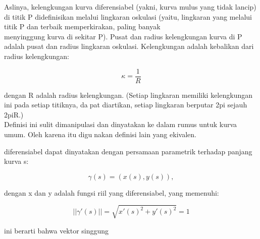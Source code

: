 \documentclass[a4paper,10pt]{article}
\begin{document}
\begin{eulernotebook}
\begin{eulercomment}
\begin{eulercomment}
\begin{eulercomment}
\begin{eulercomment}
\begin{eulercomment}
\begin{eulercomment}
\begin{eulercomment}
\begin{eulercomment}
\begin{eulercomment}
\begin{eulercomment}
\begin{eulercomment}
\begin{eulercomment}
\begin{eulercomment}
\begin{eulercomment}
\begin{eulercomment}
\begin{eulercomment}
\begin{eulercomment}
\begin{eulercomment}
\begin{eulercomment}
\begin{eulercomment}
\begin{eulercomment}
Aslinya, kelengkungan kurva diferensiabel (yakni, kurva mulus yang
tidak lancip) di titik P didefinisikan melalui lingkaran oskulasi
(yaitu, lingkaran yang melalui titik P dan terbaik memperkirakan,
paling banyak\\
menyinggung kurva di sekitar P). Pusat dan radius kelengkungan kurva
di P adalah pusat dan radius lingkaran oskulasi. Kelengkungan adalah
kebalikan dari radius kelengkungan:


\end{eulercomment}
\begin{eulerformula}
\[
\kappa = \frac{1}{R}
\]
\end{eulerformula}
\begin{eulercomment}
dengan R adalah radius kelengkungan. (Setiap lingkaran memiliki
kelengkungan ini pada setiap titiknya, dapat diartikan, setiap
lingkaran berputar 2pi sejauh 2piR.)\\
Definisi ini sulit dimanipulasi dan dinyatakan ke dalam rumus untuk
kurva umum. Oleh karena itu digunakan definisi lain yang ekivalen.

\begin{eulercomment}
\begin{eulercomment}
diferensiabel dapat dinyatakan dengan persamaan parametrik terhadap
panjang kurva s:

\end{eulercomment}
\begin{eulerformula}
\[
\gamma(s)=(x(s),y(s)),
\]
\end{eulerformula}
\begin{eulercomment}
dengan x dan y adalah fungsi riil yang diferensiabel, yang memenuhi:

\end{eulercomment}
\begin{eulerformula}
\[
||\gamma'(s)||=\sqrt{x'(s)^2+y'(s)^2}=1
\]
\end{eulerformula}
\begin{eulercomment}
ini berarti bahwa vektor singgung


\end{eulercomment}
\end{eulercomment}
\end{eulercomment}
\end{eulercomment}
\end{eulercomment}
\end{eulercomment}
\end{eulercomment}
\end{eulercomment}
\end{eulercomment}
\end{eulercomment}
\end{eulercomment}
\end{eulercomment}
\end{eulercomment}
\end{eulercomment}
\end{eulercomment}
\end{eulercomment}
\end{eulercomment}
\end{eulercomment}
\end{eulercomment}
\end{eulercomment}
\end{eulercomment}
\end{eulercomment}
\end{eulercomment}
\end{eulernotebook}
\end{document}
